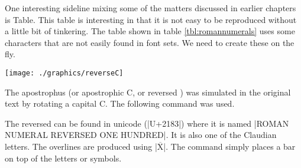 \begin{multicols}{2}
One interesting sideline mixing some of the matters discussed in earlier chapters is Table. This table is interesting in that it is not easy to be reproduced without a little bit of tinkering. The table shown in table \ref{tbl:romannumerals} uses some characters that are not easily found in font sets. We need to create these on the fly.


  \centerline{\texttt{[image: ./graphics/reverseC]}}

  \label{fig:romannumerals}



\newcommand\nbrotC{\xspace}

 The apostrophus (or apostrophic C, or reversed \nbrotC ) was simulated in the original text
 by rotating a capital C. The following command was used.
\end{multicols}

\begin{teXXX}
\def\nbrotC{\rotatebox[origin=c]{180}{C}\xspace}
\end{teXXX}

The reversed \texttt{\string\nbrotC} can be found in unicode (|U+2183|) where it  is named |ROMAN NUMERAL REVERSED ONE HUNDRED|. It is also one of the Claudian letters. The overlines are produced using |$\overline{\text{X}}$|. The  command simply places a bar on top of the letters or symbols.


\def\nbrotC{\rotatebox[origin=c]{180}{C}\xspace}



